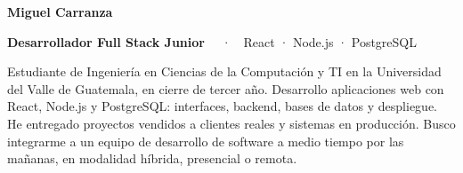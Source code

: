 \documentclass[10pt]{article}
\begin{document}
\hspace*{18pt}\hspace*{24pt}%
\begin{minipage}[t][0.97\paperheight][t]{\dimexpr0.665\paperwidth-52pt\relax}
\vspace{26pt}

{\color{ink}\fontsize{30}{32}\selectfont\bfseries Miguel Carranza}\par
\vspace{5pt}
{\color{accent}\fontsize{11.5}{14}\selectfont\bfseries Desarrollador Full Stack Junior}%
{\color{muted}\fontsize{11.5}{14}\selectfont\ \ ·\ \ React · Node.js · PostgreSQL}\par
\vspace{8pt}
Estudiante de Ingeniería en Ciencias de la Computación y TI en la Universidad del Valle de Guatemala, en cierre de tercer año. Desarrollo aplicaciones web con React, Node.js y PostgreSQL: interfaces, backend, bases de datos y despliegue. He entregado proyectos vendidos a clientes reales y sistemas en producción. Busco integrarme a un equipo de desarrollo de software a medio tiempo por las mañanas, en modalidad híbrida, presencial o remota.\par


\end{minipage}
\end{document}
